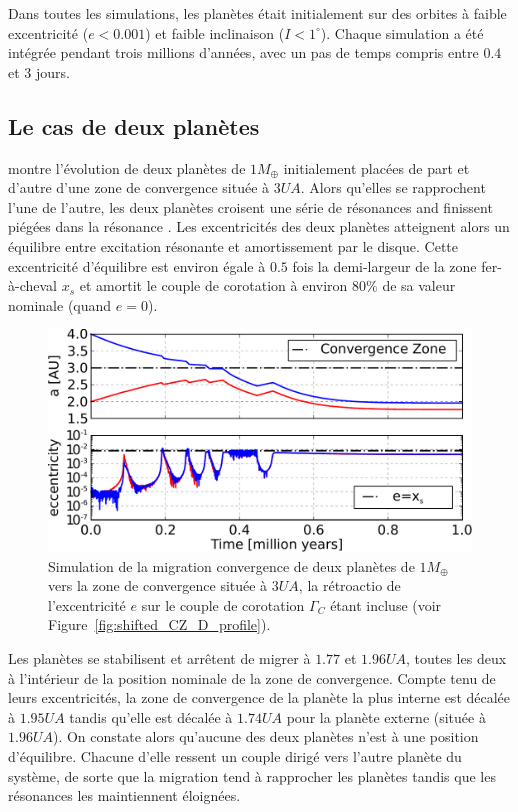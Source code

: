 \bigskip

Dans toutes les simulations, les planètes était initialement sur des orbites à faible excentricité ($e<0.001$) et faible inclinaison ($I<1^\circ$). Chaque simulation a été intégrée pendant trois millions d'années, avec un pas de temps compris entre $0.4$ et $3$ jours.

\subsection{Le cas de deux planètes}
 montre l'évolution de deux planètes de $1\unit{M_\oplus}$ initialement placées de part et d'autre d'une zone de convergence située à $3\unit{UA}$. Alors qu'elles se rapprochent l'une de l'autre, les deux planètes croisent une série de résonances and finissent piégées dans la résonance . Les excentricités des deux planètes atteignent alors un équilibre entre excitation résonante et amortissement par le disque. Cette excentricité d'équilibre est environ égale à $0.5$ fois la demi-largeur de la zone fer-à-cheval $x_s$ et amortit le couple de corotation à environ $80\%$ de sa valeur nominale (quand $e=0$). 

\begin{figure}[htb]
\centering
\includegraphics[width=\linewidth]{figure/shifted/corotation_damping_influence.pdf}
\caption{Simulation de la migration convergence de deux planètes de $1\unit{M_\oplus}$ vers la zone de convergence située à $3\unit{UA}$, la rétroactio de l'excentricité $e$ sur le couple de corotation $\Gamma_C$ étant incluse (voir Figure~\ref{fig:shifted_CZ_D_profile}).}
\label{fig:two-planets}
\end{figure}

Les planètes se stabilisent et arrêtent de migrer à $1.77$ et $1.96\unit{UA}$, toutes les deux à l'intérieur de la position nominale de la zone de convergence. Compte tenu de leurs excentricités, la zone de convergence de la planète la plus interne est décalée à $1.95\unit{UA}$ tandis qu'elle est décalée à $1.74\unit{UA}$ pour la planète externe (située à $1.96\unit{UA}$). On constate alors qu'aucune des deux planètes n'est à une position d'équilibre. Chacune d'elle ressent un couple dirigé vers l'autre planète du système, de sorte que la migration tend à rapprocher les planètes tandis que les résonances les maintiennent éloignées.

